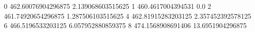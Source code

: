 0 462.60076904296875 2.139068603515625
1 460.4617004394531 0.0
2 461.74920654296875 1.287506103515625
4 462.81915283203125 2.357452392578125
6 466.5196533203125 6.057952880859375
8 474.1568908691406 13.6951904296875
